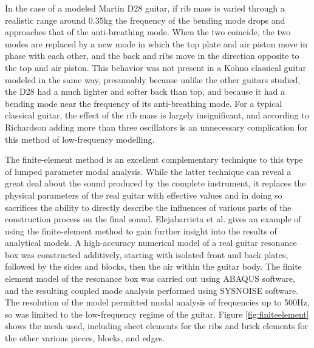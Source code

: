 \documentclass[
reprint,amsmath,amssymb,showpacs,citeautoscript,prb,twocolumn,notitlepage,floatfix
]{revtex4-1}
\begin{document}
In the case of a modeled Martin D28 guitar, if rib mass is varied through a realistic range around 0.35kg the frequency of the bending mode drops and approaches that of the anti-breathing mode\cite{PoppJohnE2012Fmco}. When the two coincide, the two modes are replaced by a new mode in which the top plate and air piston move in phase with each other, and the back and ribs move in the direction opposite to the top and air piston. This behavior was not present in a Kohno classical guitar modeled in the same way, presumably because unlike the other guitars studied, the D28 had a much lighter and softer back than top, and because it had a bending mode near the frequency of its anti-breathing mode. For a typical classical guitar, the effect of the rib mass is largely insignificant, and according to Richardson adding more than three oscillators is an unnecessary complication for this method of low-frequency modelling.\cite{richardson:hal-00811279}

The finite-element method is an excellent complementary technique to this type of lumped parameter modal analysis. While the latter technique can reveal a great deal about the sound produced by the complete instrument, it replaces the physical parameters of the real guitar with effective values and in doing so sacrifices the ability to directly describe the influences of various parts of the construction process on the final sound. Elejabarrieta et al. gives an example of using the finite-element method to gain further insight into the results of analytical models.\cite{elejabarrieta2002:doi:10.1121/1.1470163} A high-accuracy numerical model of a real guitar resonance box was constructed additively, starting with isolated front and back plates, followed by the sides and blocks, then the air within the guitar body.  The finite element model of the resonance box was carried out using ABAQUS software, and the resulting coupled mode analysis performed using SYSNOISE software. The resolution of the model permitted modal analysis of frequencies up to 500Hz, so was limited to the low-frequency regime of the guitar. Figure \ref{fig:finiteelement} shows the mesh used, including sheet elements for the ribs and brick elements for the other various pieces, blocks, and edges.
\end{document}
